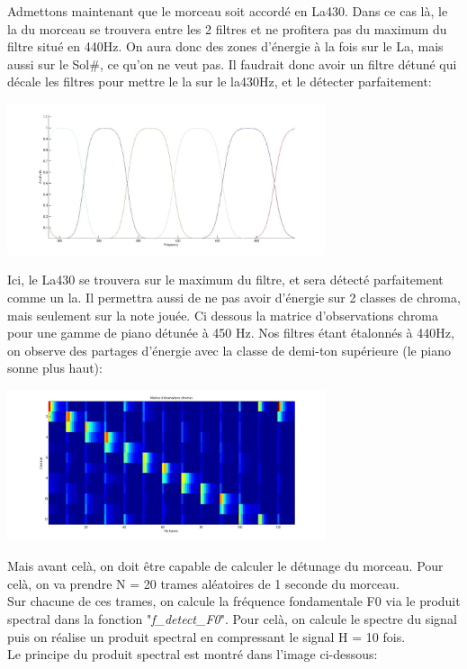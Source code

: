\documentclass[12pt,a4paper]{article}
\begin{document}
Admettons maintenant que le morceau soit accordé en La430. Dans ce cas là, le la du morceau se trouvera entre les 2 filtres et ne profitera pas du maximum du filtre situé en 440Hz. On aura donc des zones d'énergie à la fois sur le La, mais aussi sur le Sol#, ce qu'on ne veut pas. Il faudrait donc avoir un filtre détuné qui décale les filtres pour mettre le la sur le la430Hz, et le détecter parfaitement:


\begin{center}
\includegraphics[width=0.7\textwidth]{chroma_tuned430_zoom.jpg}
\end{center}

Ici, le La430 se trouvera sur le maximum du filtre, et sera détecté parfaitement comme un la. Il permettra aussi de ne pas avoir d'énergie sur 2 classes de chroma, mais seulement sur la note jouée. Ci dessous la matrice d'observations chroma pour une gamme de piano détunée à 450 Hz. Nos filtres étant étalonnés à 440Hz, on observe des partages d'énergie avec la classe de demi-ton supérieure (le piano sonne plus haut):

\begin{center}
\includegraphics[width=0.7\textwidth]{obs_chroma_tuned430_piano.jpg}
\end{center}

Mais avant celà, on doit être capable de calculer le détunage du morceau. Pour celà, on va prendre N = 20 trames aléatoires de 1 seconde du morceau. 
\\Sur chacune de ces trames, on calcule la fréquence fondamentale F0 via le produit spectral dans la fonction "\textit{f\_detect\_F0}". Pour celà, on calcule le spectre du signal puis on réalise un produit spectral en compressant le signal H = 10 fois.
\\Le principe du produit spectral est montré dans l'image ci-dessous:
\end{document}
